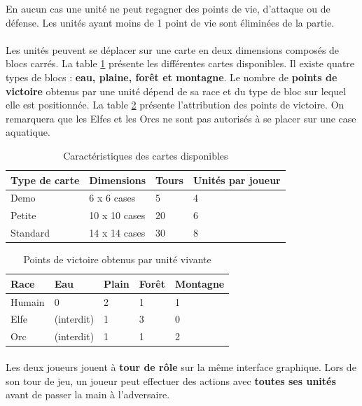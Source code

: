 En aucun cas une unité ne peut regagner des points de vie, d'attaque ou de défense. Les unités ayant moins de 1 point de vie sont éliminées de la partie.

\paragraph{}
Les unités peuvent se déplacer sur une carte en deux dimensions composés de blocs carrés. La table \ref{fig:map_types} présente les différentes cartes disponibles.
Il existe quatre types de blocs : \textbf{eau, plaine, forêt et montagne}. Le nombre de \textbf{points de victoire} obtenus par une unité dépend de sa race et du type de bloc sur lequel elle est positionnée.
La table \ref{fig:victory_points} présente l'attribution des points de victoire. On remarquera que les Elfes et les Orcs ne sont pas autorisés à se placer sur une case aquatique.

\begin{table}[h!]
  \centering
  \begin{tabular}{|l|l|l|l|}
    \hline
    Type de carte&Dimensions&Tours&Unités par joueur\\
    \hline
    Demo&6 x 6 cases&5&4\\
    \hline
    Petite&10 x 10 cases&20&6\\
    \hline
    Standard&14 x 14 cases&30&8\\
    \hline
  \end{tabular}
  \caption{Caractéristiques des cartes disponibles}
  \label{fig:map_types}
\end{table}

\begin{table}[h!]
  \centering
  \begin{tabular}{|l|l|l|l|l|}
    \hline
    Race&Eau&Plain&Forêt&Montagne\\
    \hline
    Humain&0&2&1&1\\
    \hline
    Elfe&(interdit)&1&3&0\\
    \hline
    Orc&(interdit)&1&1&2\\
    \hline
  \end{tabular}
  \caption{Points de victoire obtenus par unité vivante}
  \label{fig:victory_points}
\end{table}

\paragraph{}
Les deux joueurs jouent à \textbf{tour de rôle} sur la même interface graphique. Lors de son tour de jeu, un joueur peut effectuer des actions avec \textbf{toutes ses unités} avant de passer la main à l'adversaire.

